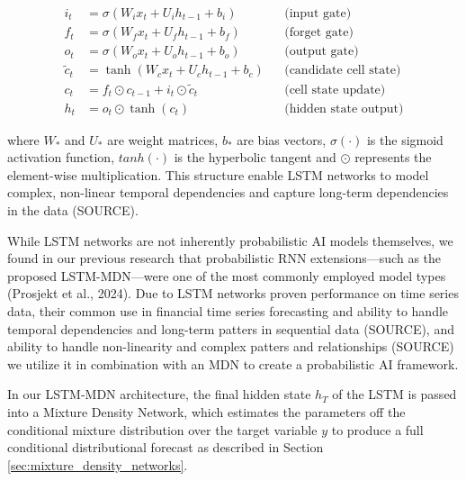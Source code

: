 \begin{equation}
    \begin{aligned}
        i_t &= \sigma(W_i x_t + U_i h_{t-1} + b_i) &&\text{(input gate)} \\
        f_t &= \sigma(W_f x_t + U_f h_{t-1} + b_f) &&\text{(forget gate)} \\
        o_t &= \sigma(W_o x_t + U_o h_{t-1} + b_o) &&\text{(output gate)} \\
        \tilde{c}_t &= \tanh(W_c x_t + U_c h_{t-1} + b_c) &&\text{(candidate cell state)} \\
        c_t &= f_t \odot c_{t-1} + i_t \odot \tilde{c}_t &&\text{(cell state update)} \\
        h_t &= o_t \odot \tanh(c_t) &&\text{(hidden state output)}
    \end{aligned}
\end{equation}

where $W_*$ and $U_*$ are weight matrices, $b_*$ are bias vectors, $\sigma(\cdot)$ is the sigmoid activation function, $tanh(\cdot)$ is the hyperbolic tangent and $\odot$ represents the element-wise multiplication. This structure enable LSTM networks to model complex, non-linear temporal dependencies and capture long-term dependencies in the data (SOURCE).

While LSTM networks are not inherently probabilistic AI models themselves, we found in our previous research that probabilistic RNN extensions—such as the proposed LSTM-MDN—were one of the most commonly employed model types (Prosjekt et al., 2024). Due to LSTM networks proven performance on time series data, their common use in financial time series forecasting and ability to handle temporal dependencies and long-term patters in sequential data (SOURCE), and ability to handle non-linearity and complex patters and relationships (SOURCE) we utilize it in combination with an MDN to create a probabilistic AI framework. 

In our LSTM-MDN architecture, the final hidden state $h_T$ of the LSTM is passed into a Mixture Density Network, which estimates the parameters off the conditional mixture distribution over the target variable $y$ to produce a full conditional distributional forecast as described in Section \ref{sec:mixture_density_networks}. 


